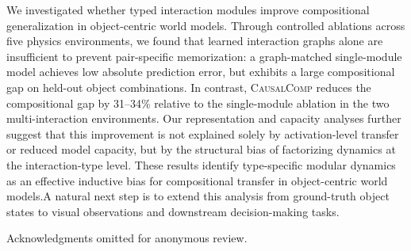 \documentclass{article}
\newcommand{\ours}{\textsc{CausalComp}}
\begin{document}

We investigated whether typed interaction modules improve compositional generalization in object-centric world models. Through controlled ablations across five physics environments, we found that learned interaction graphs alone are insufficient to prevent pair-specific memorization: a graph-matched single-module model achieves low absolute prediction error, but exhibits a large compositional gap on held-out object combinations. In contrast, \ours{} reduces the compositional gap by 31--34\% relative to the single-module ablation in the two multi-interaction environments. Our representation and capacity analyses further suggest that this improvement is not explained solely by activation-level transfer or reduced model capacity, but by the structural bias of factorizing dynamics at the interaction-type level. These results identify type-specific modular dynamics as an effective inductive bias for compositional transfer in object-centric world models.A natural next step is to extend this analysis from ground-truth object states to visual observations and downstream decision-making tasks.

\begin{ack}
Acknowledgments omitted for anonymous review.
\end{ack}
\end{document}
